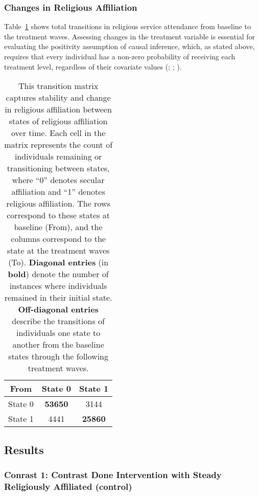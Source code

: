 \documentclass[
  single column]{article}
\begin{document}
\subsubsection{Changes in Religious
Affiliation}\label{changes-in-religious-affiliation}

Table~\ref{tbl-transition} shows total transitions in religious service
attendance from baseline to the treatment waves. Assessing changes in
the treatment variable is essential for evaluating the positivity
assumption of causal inference, which, as stated above, requires that
every individual has a non-zero probability of receiving each treatment
level, regardless of their covariate values
(;
;
).

\begin{longtable}[]{@{}ccc@{}}

\caption{\label{tbl-transition}This transition matrix captures stability
and change in religious affiliation between states of religious
affiliation over time. Each cell in the matrix represents the count of
individuals remaining or transitioning between states, where ``0''
denotes secular affiliation and ``1'' denotes religious affiliation. The
rows correspond to these states at baseline (From), and the columns
correspond to the state at the treatment waves (To). \textbf{Diagonal
entries} (in \textbf{bold}) denote the number of instances where
individuals remained in their initial state. \textbf{Off-diagonal
entries} describe the transitions of individuals one state to another
from the baseline states through the following treatment waves.}

\tabularnewline

\toprule\noalign{}
From & State 0 & State 1 \\
\midrule\noalign{}
\endhead
\bottomrule\noalign{}
\endlastfoot
State 0 & \textbf{53650} & 3144 \\
State 1 & 4441 & \textbf{25860} \\

\end{longtable}

\newpage{}

\subsection{Results}\label{results}

\subsubsection{Conrast 1: Contrast Done Intervention with Steady
Religiously Affiliated
(control)}\label{conrast-1-contrast-done-intervention-with-steady-religiously-affiliated-control}
\end{document}
